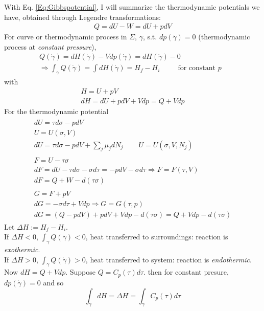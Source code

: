 \documentclass[10pt]{amsart}
\begin{document}
\begin{multicols*}{2}
With Eq. \ref{Eq:Gibbspotential}, I will summarize the thermodynamic potentials we have, obtained through Legendre transformations:
\[
\begin{gathered}
  Q = dU - W = dU + p dV
\end{gathered}
\]
For curve or thermodynamic process in $\Sigma$, $\gamma$, s.t. $dp(\dot{\gamma})=0$ (thermodynamic process at \emph{constant pressure}),
\[
\begin{gathered}
  Q(\dot{\gamma}) = dH(\dot{\gamma}) -Vdp(\dot{\gamma}) = dH(\dot{\gamma}) - 0 \\
  \Longrightarrow \int_{\gamma} Q(\dot{\gamma}) = \int dH(\dot{\gamma}) = H_f - H_i \qquad \, \text{ for constant $p$ }
\end{gathered}
\]
with 
\[
\begin{gathered}
  H = U + pV \\
  dH = dU + pdV + Vdp = Q + Vdp
\end{gathered}
\]
For the thermodynamic potential
\begin{equation}\label{Eq:ThermodynamicPotentialsSummary}
\begin{gathered}
  \begin{gathered}
    dU = \tau d\sigma - pdV \\ 
    \boxed{ U = U(\sigma, V) } \\
    dU = \tau d\sigma - pdV + \sum_j \mu_j dN_j \qquad \, U = U(\sigma, V,N_j)
\end{gathered} \\
  \begin{gathered}
    F = U -\tau \sigma  \\
    dF = dU- \tau d\sigma - \sigma d\tau = -pdV - \sigma d\tau  \Longrightarrow \boxed{ F = F(\tau,V) } \\  
    dF = Q + W - d(\tau \sigma ) 
\end{gathered} \\
  \begin{gathered}
    G = F + pV \\ 
    dG = -\sigma d\tau + Vdp \Longrightarrow \boxed{ G = G(\tau,p) } \\
    dG = (Q - pdV ) + pdV + Vdp - d(\tau \sigma ) = Q + Vdp - d(\tau \sigma)
\end{gathered}
\end{gathered}
\end{equation}
Let $\Delta H := H_f - H_i$.  \\
If $\Delta H < 0$, $\int_{\gamma} Q(\dot{\gamma}) <0$, heat transferred to surroundings: reaction is \emph{exothermic}.  \\
If $\Delta H > 0$, $\int_{\gamma} Q(\dot{\gamma}) >0$, heat transferred to system: reaction is \emph{endothermic}.  
Now $dH = Q + Vdp$.  Suppose $Q = C_p(\tau) d\tau$.  then for constant presure, $dp(\dot{\gamma})=0$ and so 
\[
\int_{\gamma} dH = \Delta H = \int_{\gamma} C_p(\tau) d\tau
\]


\end{multicols*}
\end{document}

